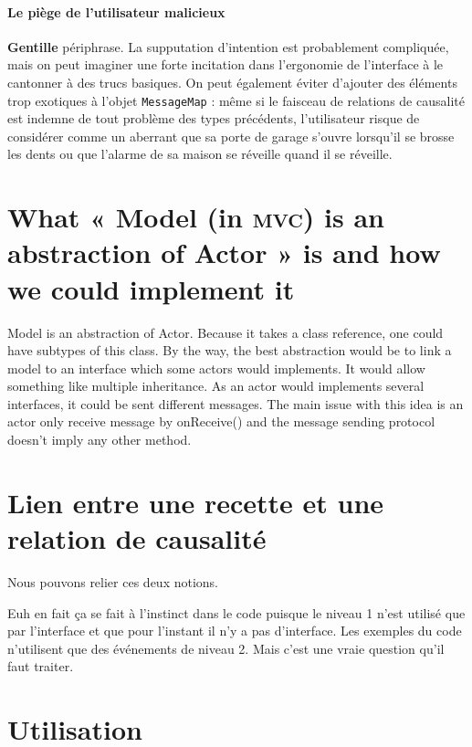 \documentclass[11pt]{article}
\begin{document}
\paragraph{Le piège de l'utilisateur malicieux} \textbf{Gentille} périphrase. La supputation d'intention est probablement compliquée, mais on peut imaginer une forte incitation dans l'ergonomie de l'interface à le cantonner à des trucs basiques. On peut également éviter d'ajouter des éléments trop exotiques à l'objet \texttt{MessageMap} : même si le faisceau de relations de causalité est indemne de tout problème des types précédents, l'utilisateur risque de considérer comme un aberrant que sa porte de garage s'ouvre lorsqu'il se brosse les dents ou que l'alarme de sa maison se réveille quand il se réveille.


\section{What « Model (in \textsc{mvc}) is an abstraction of Actor » is and how we could implement it}

Model is an abstraction of Actor. Because it takes a class reference, one could have subtypes of this class. By the way, the best abstraction would be to link a model to an interface which some actors would implements. It would allow something like multiple inheritance. As an actor would implements several interfaces, it could be sent different messages. The main issue with this idea is an actor only receive message by onReceive() and the message sending protocol doesn't imply any other method.


\section{Lien entre une recette et une relation de causalité}

Nous pouvons relier ces deux notions.

Euh en fait ça se fait à l'instinct dans le code puisque le niveau 1 n'est utilisé que par l'interface et que pour l'instant il n'y a pas d'interface. Les exemples du code n'utilisent que des événements de niveau 2. Mais c'est une vraie question qu'il faut traiter.

\section{Utilisation}
\end{document}
